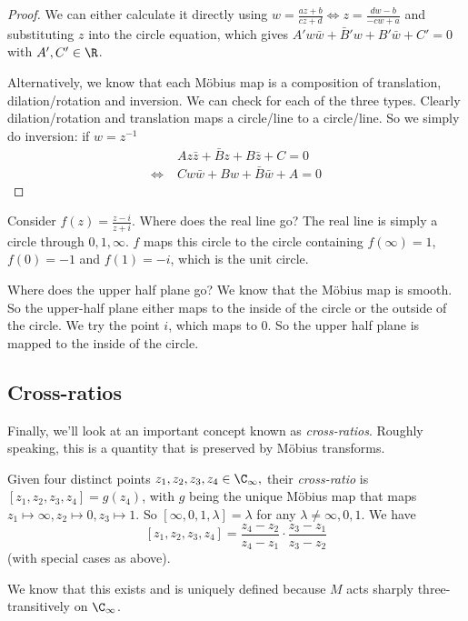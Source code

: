 \documentclass[a4paper]{article}
\begin{document}
\begin{proof}
  We can either calculate it directly using $w = \frac{az + b}{cz + d}\Leftrightarrow z = \frac{dw - b}{-cw + a}$ and substituting $z$ into the circle equation, which gives $A' w\bar w + \bar B' w + B'\bar w + C' = 0$ with $A', C'\in \R$.

  Alternatively, we know that each M\"obius map is a composition of translation, dilation/rotation and inversion. We can check for each of the three types. Clearly dilation/rotation and translation maps a circle/line to a circle/line. So we simply do inversion: if $w = z^{-1}$
  \begin{align*}
    &\; Az\bar z + \bar Bz + B\bar z + C = 0\\
    \Leftrightarrow &\; Cw\bar w + Bw + \bar B\bar w + A = 0
  \end{align*}
\end{proof}

\begin{eg}
  Consider $f(z) = \frac{z - i}{z + i}$. Where does the real line go? The real line is simply a circle through $0, 1, \infty$. $f$ maps this circle to the circle containing $f(\infty) = 1$, $f(0) = -1$ and $f(1) = -i$, which is the unit circle.

  Where does the upper half plane go? We know that the M\"obius map is smooth. So the upper-half plane either maps to the inside of the circle or the outside of the circle. We try the point $i$, which maps to $0$. So the upper half plane is mapped to the inside of the circle.
\end{eg}
\subsection{Cross-ratios}
  Finally, we'll look at an important concept known as \emph{cross-ratios}. Roughly speaking, this is a quantity that is preserved by M\"obius transforms.

\begin{defi}
  Given four distinct points $z_1, z_2, z_3, z_4\in \C_\infty,$ their \emph{cross-ratio} is $[z_1, z_2, z_3, z_4] = g(z_4)$, with $g$ being the unique M\"obius map that maps $z_1\mapsto \infty, z_2\mapsto 0, z_3\mapsto 1$. So $[\infty, 0, 1, \lambda] = \lambda$ for any $\lambda\not= \infty, 0, 1$. We have
  \[
    [z_1, z_2, z_3, z_4] = \frac{z_4 - z_2}{z_4 - z_1} \cdot \frac{z_3 - z_1}{z_3 - z_2}
  \]
  (with special cases as above).
\end{defi}
We know that this exists and is uniquely defined because $M$ acts sharply three-transitively on $\C_\infty$.
\end{document}
